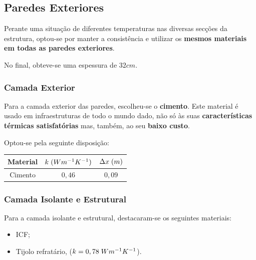 \documentclass[12pt, a4paper]{article}
\begin{document}
\subsection{Paredes Exteriores}\label{sec:pext}

Perante uma situação de diferentes temperaturas nas diversas secções da estrutura, optou-se por manter a consistência
e utilizar os \textbf{mesmos materiais em todas as paredes exteriores}.

No final, obteve-se uma espessura de $32cm$.

\subsubsection{Camada Exterior}\label{sec:pext_ce}

Para a camada exterior das paredes, escolheu-se o \textbf{cimento}. Este material é usado em infraestruturas de todo o mundo
dado, não só às suas \textbf{características térmicas satisfatórias} mas, também, ao seu \textbf{baixo custo}.

Optou-se pela seguinte disposição:

\begin{center}
	\begin{tabular}{||c c c||}
		\hline
		Material & $k \hspace{1mm} (Wm^{-1}K^{-1})$ & $\Delta x \hspace{1mm} (m)$ \\ [0.5ex]
		\hline\hline
		Cimento  & $0,46$                           & $0,09$                      \\
		\hline
	\end{tabular}
\end{center}

\subsubsection{Camada Isolante e Estrutural}\label{sec:pext_cie}

Para a camada isolante e estrutural, destacaram-se os seguintes materiais:

\begin{center}
	\begin{itemize}
		\item ICF;
		\item Tijolo refratário, ($k=0,78 \hspace{1mm} Wm^{-1}K^{-1}$).
	\end{itemize}
\end{center}
\end{document}
